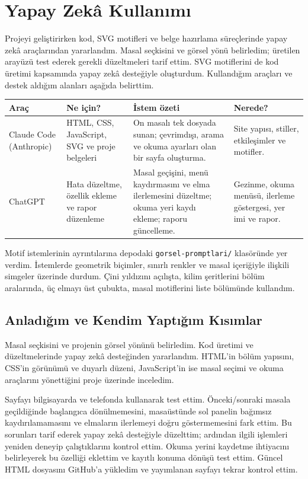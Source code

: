\documentclass[12pt,a4paper]{article}
\begin{document}
\section{Yapay Zekâ Kullanımı}
Projeyi geliştirirken kod, SVG motifleri ve belge hazırlama süreçlerinde yapay zekâ araçlarından yararlandım. Masal seçkisini ve görsel yönü belirledim; üretilen arayüzü test ederek gerekli düzeltmeleri tarif ettim. SVG motiflerini de kod üretimi kapsamında yapay zekâ desteğiyle oluşturdum. Kullandığım araçları ve destek aldığım alanları aşağıda belirttim.
\begin{longtable}{@{}p{2.3cm}p{3.5cm}p{4.4cm}p{3.5cm}@{}}
\toprule\textbf{Araç} & \textbf{Ne için?} & \textbf{İstem özeti} & \textbf{Nerede?}\\\midrule\endhead
Claude Code (Anthropic) & HTML, CSS, JavaScript, SVG ve proje belgeleri & On masalı tek dosyada sunan; çevrimdışı, arama ve okuma ayarları olan bir sayfa oluşturma. & Site yapısı, stiller, etkileşimler ve motifler.\\[6pt]
ChatGPT & Hata düzeltme, özellik ekleme ve rapor düzenleme & Masal geçişini, menü kaydırmasını ve elma ilerlemesini düzeltme; okuma yeri kaydı ekleme; raporu güncelleme. & Gezinme, okuma menüsü, ilerleme göstergesi, yer imi ve rapor.\\
\bottomrule
\end{longtable}
Motif istemlerinin ayrıntılarına depodaki \texttt{gorsel-promptlari/} klasöründe yer verdim. İstemlerde geometrik biçimler, sınırlı renkler ve masal içeriğiyle ilişkili simgeler üzerinde durdum. Çini yıldızını açılışta, kilim şeritlerini bölüm aralarında, üç elmayı üst çubukta, masal motiflerini liste bölümünde kullandım.

\subsection{Anladığım ve Kendim Yaptığım Kısımlar}
Masal seçkisini ve projenin görsel yönünü belirledim. Kod üretimi ve düzeltmelerinde yapay zekâ desteğinden yararlandım. HTML'in bölüm yapısını, CSS'in görünümü ve duyarlı düzeni, JavaScript'in ise masal seçimi ve okuma araçlarını yönettiğini proje üzerinde inceledim.

Sayfayı bilgisayarda ve telefonda kullanarak test ettim. Önceki/sonraki masala geçildiğinde başlangıca dönülmemesini, masaüstünde sol panelin bağımsız kaydırılamamasını ve elmaların ilerlemeyi doğru göstermemesini fark ettim. Bu sorunları tarif ederek yapay zekâ desteğiyle düzelttim; ardından ilgili işlemleri yeniden deneyip çalıştıklarını kontrol ettim. Okuma yerini kaydetme ihtiyacını belirleyerek bu özelliği eklettim ve kayıtlı konuma dönüşü test ettim. Güncel HTML dosyasını GitHub'a yükledim ve yayımlanan sayfayı tekrar kontrol ettim.
\end{document}
